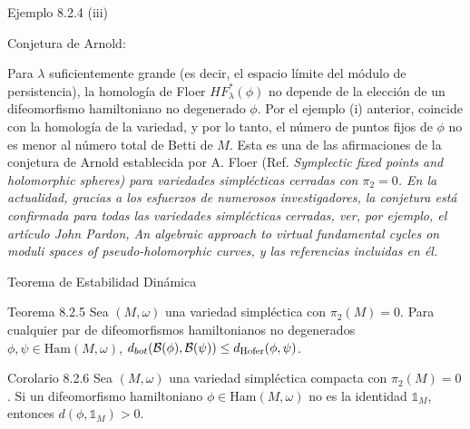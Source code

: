 \documentclass{beamer}
\renewcommand{\d}{d}
\newcommand{\mrm}{\mathrm}
\newcommand{\Ham}{\mrm{Ham}}
\begin{document}
\begin{frame}{Ejemplo 8.2.4 (iii)}

Conjetura de Arnold: \pause

Para $\lambda$ suficientemente grande (es decir, el espacio límite del módulo de persistencia), la homología de Floer $HF_\lambda^*(\phi)$ no depende de la elección de un difeomorfismo hamiltoniano no degenerado $\phi$. \pause Por el ejemplo (i) anterior, coincide con la homología de la variedad, y por lo tanto, el número de puntos fijos de $\phi$ no es menor al número total de Betti de $M$. \pause Esta es una de las afirmaciones de la conjetura de Arnold establecida por A. Floer (Ref. \it{Symplectic fixed points and holomorphic spheres}) para variedades simplécticas cerradas con $\pi_2 = 0$. \pause En la actualidad, gracias a los esfuerzos de numerosos investigadores, la conjetura está confirmada para todas las variedades simplécticas cerradas, ver, por ejemplo, el artículo John Pardon, \it{An algebraic approach to virtual fundamental cycles on moduli spaces
of pseudo-holomorphic curves}, y las referencias incluidas en él.


    
\end{frame}

\begin{frame}{Teorema de Estabilidad Dinámica}

\begin{block}{Teorema 8.2.5}
Sea $(M, \omega)$ una variedad simpléctica con $\pi_2(M) =0$. Para cualquier par de difeomorfismos hamiltonianos no degenerados $\phi, \psi \in \Ham(M, \omega)$, $d_{bot}(\mathcal B(\phi), \mathcal B(\psi)) \leq d_{\rm Hofer}(\phi, \psi)$.


 \end{block} \pause

\begin{block}{Corolario 8.2.6}
Sea $(M, \omega)$ una variedad simpléctica compacta con $\pi_2(M) =0$. Si un difeomorfismo hamiltoniano $\phi \in \Ham(M, \omega)$ no es la identidad $\mathds{1}_M$, entonces $\d(\phi, \mathds{1}_M) >0$.



 \end{block} 
    
\end{frame}
\end{document}
